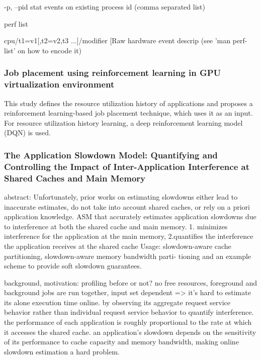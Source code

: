 \documentclass[UTF8]{article}
\begin{document}
-p, --pid stat events on existing process id (comma separated list)

perf list

cpu/t1=v1[,t2=v2,t3 ...]/modifier                  [Raw hardware event descrip
(see 'man perf-list' on how to encode it)

\subsubsection{Job placement using reinforcement learning in GPU virtualization environment}

This study defines the resource utilization history of applications and proposes a reinforcement learning-based job placement technique, which uses it as an input. For resource utilization history learning, a deep reinforcement learning model (DQN) is used.

 
\subsubsection{The Application Slowdown Model: Quantifying and Controlling the Impact of Inter-Application Interference at Shared Caches and Main Memory}

abstract: Unfortunately, prior works on estimating slowdowns either lead to inaccurate estimates, do not take into account shared caches, or rely on a priori application knowledge. ASM that accurately estimates application slowdowns due to interference at both the shared cache and main memory.  1. minimizes interference for the application at the main memory, 2.quantifies the interference the application receives at the shared cache Usage: slowdown-aware cache partitioning, slowdown-aware memory bandwidth parti- tioning and an example scheme to provide soft slowdown guarantees.

background, motivation: profiling before or not?  no free resources, foreground and background jobs are run together, input set dependent => it's hard to estimate its alone execution time online.   by observing its aggregate request service behavior rather than individual request service behavior to quantify interference.  the performance of each application is roughly proportional to the rate at which it accesses the shared cache.   an application’s slowdown depends on the sensitivity of its performance to cache capacity and memory bandwidth, making online slowdown estimation a hard problem.  
\end{document}
